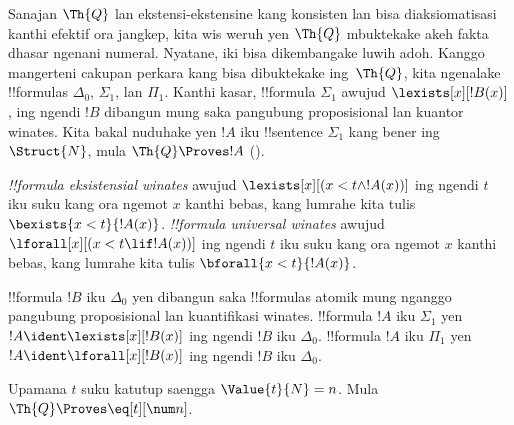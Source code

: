 \documentclass[../../../include/open-logic-section]{subfiles}
\begin{document}

Sanajan $\Th{Q}$ lan ekstensi-ekstensine kang konsisten lan bisa
diaksiomatisasi kanthi efektif ora jangkep, kita wis weruh yen $\Th{Q}$ mbuktekake
akeh fakta dhasar ngenani numeral. Nyatane, iki bisa dikembangake
luwih adoh. Kanggo mangerteni cakupan perkara kang bisa dibuktekake
ing~$\Th{Q}$, kita ngenalake !!{formula}s $\Delta_0$, $\Sigma_1$,
lan $\Pi_1$. Kanthi kasar, !!{formula} $\Sigma_1$ awujud
$\lexists[x][!B(x)]$, ing ngendi $!B$ dibangun mung saka pangubung
proposisional lan kuantor winates. Kita bakal nuduhake yen $!A$ iku
!!{sentence} $\Sigma_1$ kang bener ing $\Struct{N}$, mula
$\Th{Q} \Proves !A$ ().

\begin{defn}
\emph{!!{formula} eksistensial winates} awujud
$\lexists[x][(x < t \land !A(x))]$ ing ngendi $t$ iku suku kang ora ngemot $x$ kanthi bebas,
kang lumrahe kita tulis $\bexists{x < t}{!A(x)}$.
%
\emph{!!{formula} universal winates} awujud
$\lforall[x][(x < t \lif !A(x))]$ ing ngendi $t$ iku suku kang ora ngemot $x$ kanthi bebas,
kang lumrahe kita tulis $\bforall{x < t}{!A(x)}$.
\end{defn}

\begin{defn}
!!{formula} $!B$ iku $\Delta_0$ yen dibangun saka !!{formula}s
atomik mung nganggo pangubung proposisional lan kuantifikasi
winates.
%
!!{formula} $!A$ iku $\Sigma_1$ yen
$!A \ident \lexists[x][!B(x)]$ ing ngendi $!B$ iku $\Delta_0$.
%
!!{formula} $!A$ iku $\Pi_1$ yen
$!A \ident \lforall[x][!B(x)]$ ing ngendi $!B$ iku $\Delta_0$.
\end{defn}

\begin{lem}
 Upamana $t$ suku katutup saengga
$\Value{t}{N} = n$. Mula $\Th{Q} \Proves \eq[t][\num n]$.
\end{lem}
\end{document}

